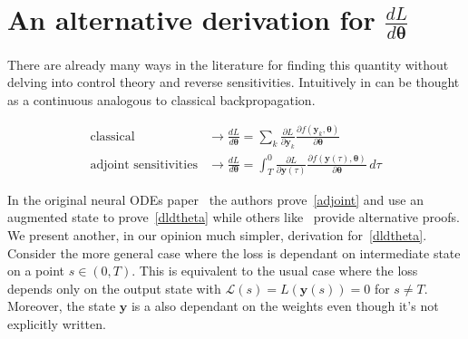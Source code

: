 \documentclass[11pt]{article}
\begin{document}
    \section{An alternative derivation for $\frac{dL}{d \pmb{\theta}}$}
    \label{adjoint_proof}
    There are already many ways in the literature for finding this quantity without delving into control theory and reverse sensitivities.
    Intuitively in can be thought as a continuous analogous to classical backpropagation.

    \begin{align}
        \text{classical} &\to
        \frac{d L}{ d \pmb{\theta}} =
        \sum_k
        \frac{\partial L}{\partial \pmb{y}_{k}}
        \frac{\partial f(\pmb{y}_k, \pmb\theta)}{\partial \pmb{\theta}}
        \\
        \text{adjoint sensitivities} &\to
        \frac{d L}{ d \pmb{\theta}} =
        \int_T^0
        \frac{\partial L}{\partial \pmb{y}(\tau)}
        \frac{\partial f(\pmb{y}(\tau), \pmb{\theta})}{\partial \pmb{\theta}} \, d\tau
    \end{align}

    In the original neural ODEs paper~\cite{chen2018neural} the authors prove~\eqref{adjoint} and use an augmented state to prove~\eqref{dldtheta} while others like~\cite{kidger2022neural} provide alternative proofs.
    We present another, in our opinion much simpler, derivation for~\eqref{dldtheta}.
    Consider the more general case where the loss is dependant on intermediate state on a point $s \in (0,T)$.
    This is equivalent to the usual case where the loss depends only on the output state with $\mathcal{L}(s) = L(\pmb{y}(s))=0$ for $s\neq T$.
    Moreover, the state $\pmb{y}$ is a also dependant on the weights even though it's not explicitly written.
\end{document}
